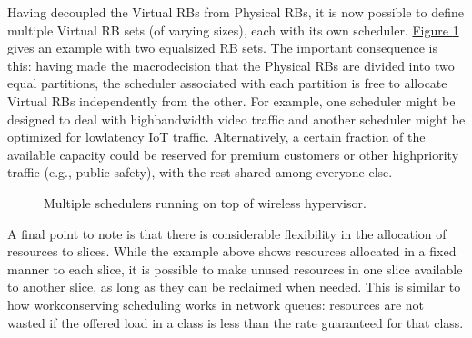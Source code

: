 \documentclass[a4paper,11pt,english]{sphinxmanual}
\let\sphinxpxdimen\pdfpxdimen\else\newdimen\sphinxpxdimen
\begin{document}
\sphinxAtStartPar
Having decoupled the Virtual RBs from Physical RBs, it is now possible
to define multiple Virtual RB sets (of varying sizes), each with its own
scheduler. \hyperref[\detokenize{radio:fig-multi-sched}]{Figure \ref{\detokenize{radio:fig-multi-sched}}} gives an example with two
equal\sphinxhyphen{}sized RB sets. The important consequence is this: having made
the macro\sphinxhyphen{}decision that the Physical RBs are divided into two equal
partitions, the scheduler associated with each partition is free to
allocate Virtual RBs independently from the other. For
example, one scheduler might be designed to deal with high\sphinxhyphen{}bandwidth
video traffic and another scheduler might be optimized for low\sphinxhyphen{}latency
IoT traffic. Alternatively, a certain fraction of the available capacity
could be reserved for premium customers or other high\sphinxhyphen{}priority traffic
(e.g., public safety), with the rest shared among everyone else.

\begin{figure}[ht]
\centering
\capstart

\noindent\sphinxincludegraphics[width=600\sphinxpxdimen]{{Slide20}.png}
\caption{Multiple schedulers running on top of wireless
hypervisor.}\label{\detokenize{radio:id11}}\label{\detokenize{radio:fig-multi-sched}}\end{figure}

\sphinxAtStartPar
A final point to note is that there is considerable flexibility in the
allocation of resources to slices. While the example above shows
resources allocated in a fixed manner to each slice, it is possible to
make unused resources in one slice available to another slice, as long
as they can be reclaimed when needed. This is similar to how work\sphinxhyphen{}conserving
scheduling works in network queues: resources are not wasted if the
offered load in a class is less than the rate guaranteed for that class.
\end{document}

